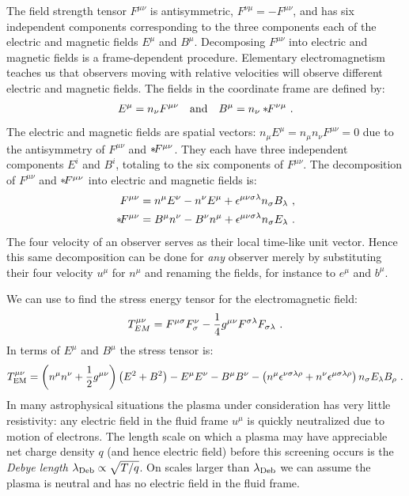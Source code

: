 The field strength tensor $F^{\mu\nu}$ is antisymmetric, $F^{\nu\mu} = -F^{\mu\nu}$, and has six independent components corresponding to the three components each of the electric and magnetic fields $E^\mu$ and $B^\mu$.  Decomposing $F^{\mu\nu}$ into electric and magnetic fields is a frame-dependent procedure.  Elementary electromagnetism teaches us that observers moving with relative velocities will observe different electric and magnetic fields.  The fields in the coordinate frame are defined by:
\begin{align}
	E^\mu = n_\nu F^{\mu\nu} \quad \text{and} \quad B^\mu = n_\nu \dual{F}^{\nu\mu}\ . \eqlabel{defEB}
\end{align}
The electric and magnetic fields are spatial vectors: $n_\mu E^\mu = n_\mu n_\nu F^{\mu\nu} = 0$ due to the antisymmetry of $F^{\mu\nu}$ and $*\! F^{\mu\nu}$. They each have three independent components $E^i$ and $B^i$, totaling to the six components of $F^{\mu\nu}$.  The decomposition of $F^{\mu\nu}$ and $*\! F^{\mu\nu}$ into electric and magnetic fields is:
\begin{align}
	F^{\mu\nu} &= n^\mu E^\nu - n^\nu E^\mu + \eps^{\mu\nu\sigma\lambda}n_\sigma B_\lambda\ , \eqlabel{FEB}\\
	\dualt{F}^{\mu\nu} &= B^\mu n^\nu - B^\nu n^\mu + \eps^{\mu\nu\sigma\lambda}n_\sigma E_\lambda\ .
\end{align}
The four velocity of an observer serves as their local time-like unit vector.  Hence this same decomposition can be done for \emph{any} observer merely by substituting their four velocity $u^\mu$ for $n^\mu$ and renaming the fields, for instance to $e^\mu$ and $b^\mu$.

  We can use  to find the stress energy tensor for the electromagnetic field:
  \begin{equation}
  	T^{\mu\nu}_{EM} = F^{\mu\sigma} F^\nu_\sigma - \frac{1}{4}g^{\mu\nu}F^{\sigma \lambda}F_{\sigma\lambda}\ . \eqlabel{TEMF}
  \end{equation}
  In terms of $E^\mu$ and $B^\mu$ the stress tensor is:
  \begin{equation}
  	T^{\mu\nu}_{\text{EM}} = \left(n^\mu n^\nu + \frac{1}{2}g^{\mu\nu}\right)\left(E^2 + B^2\right) - E^\mu E^\nu - B^\mu B^\nu - \left(n^\mu \eps^{\nu \sigma \lambda \rho} + n^{\nu}\eps^{\mu \sigma \lam \rho}\right)n_\sig E_\lam B_\rho\ . \eqlabel{TEMEB}
  \end{equation}
  In many astrophysical situations the plasma under consideration has very little resistivity: any electric field in the fluid frame $u^\mu$ is quickly neutralized due to motion of electrons.  The length scale on which a plasma may have appreciable net charge density $q$ (and hence electric field) before this screening occurs is the \emph{Debye length} $\lambda_{\text{Deb}} \propto \sqrt{T/q}$.  On scales larger than $\lambda_{\text{Deb}}$ we can assume the plasma is neutral and has no electric field in the fluid frame.
  
